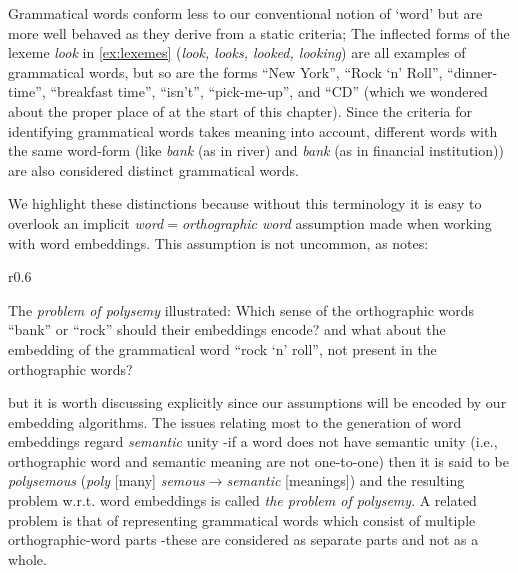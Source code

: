 
\begin{example}
  Grammatical words conform less to our conventional notion of `word' but are more well behaved as they derive from a static criteria; The inflected forms of the lexeme \emph{look} in \autoref{ex:lexemes} (\emph{look, looks, looked, looking}) are all examples of grammatical words, but so are the forms ``New York'', ``Rock `n' Roll'', ``dinner-time'', ``breakfast time'', ``isn't'', ``pick-me-up'', and ``CD'' (which we wondered about the proper place of at the start of this chapter). Since the criteria for identifying grammatical words takes meaning into account, different words with the same word-form (like \emph{bank} (as in river) and \emph{bank} (as in financial institution)) are also considered distinct grammatical words.
\end{example}
We highlight these distinctions because without this terminology it is easy to overlook an implicit \emph{word}$=$\emph{orthographic word} assumption made when working with word embeddings. This assumption is not uncommon, as \citeauthor{dixon02-word} notes:
\par
\begin{figurewrap}[13]{r}{0.6\textwidth}
  \vspace{-2.5em}
  \captionsetup{width=.55\textwidth}
  \centering
  
  \caption{The \emph{problem of polysemy} illustrated: Which sense of the orthographic words ``bank'' or ``rock'' should their embeddings encode? and what about the embedding of the grammatical word ``rock `n' roll'', not present in the orthographic words?}\label{fig:polysemy}
\end{figurewrap}
\par
but it is worth discussing explicitly since our assumptions will be encoded by our embedding algorithms. The issues relating most to the generation of word embeddings regard \emph{semantic} unity -if a word does not have semantic unity (i.e., orthographic word and semantic meaning are not one-to-one) then it is said to be \emph{polysemous} (\emph{poly} [many] \emph{semous$\rightarrow$semantic} [meanings]) and the resulting problem w.r.t. word embeddings is called \emph{the problem of polysemy}. A related problem is that of representing grammatical words which consist of multiple orthographic-word parts -these are considered as separate parts and not as a whole.
